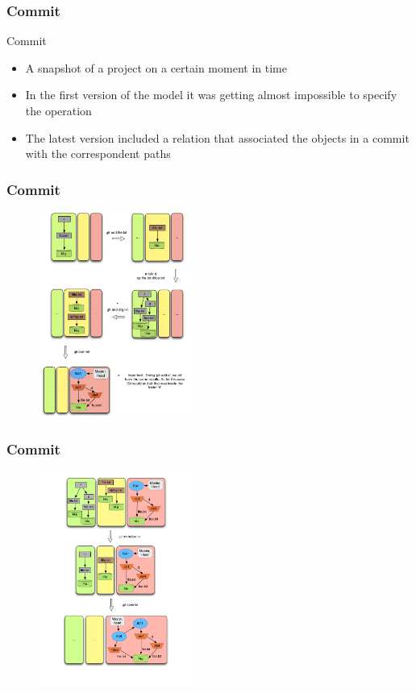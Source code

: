 \documentclass{beamer}
\begin{document}
\begin{frame}
	\frametitle{Commit}

	\begin{block}{Commit}
	\begin{itemize}
	\item A snapshot of a project on a certain moment in time
	\item In the first version of the model it was 
	getting almost impossible to specify the operation
	\item The latest version included a relation that associated
	the objects in a commit with the correspondent paths
	\end{itemize}
	\end{block}

\end{frame}

\begin{frame}[fragile]
   \frametitle{Commit}
   \begin{figure}
      \centering
      \includegraphics[width=0.45\textwidth]{images/commit1.png}
   \end{figure}
\end{frame}

\begin{frame}[fragile]
   \frametitle{Commit}
   \begin{figure}
      \centering
      \includegraphics[width=0.45\textwidth]{images/commit2.png}
   \end{figure}
\end{frame}
\end{document}
